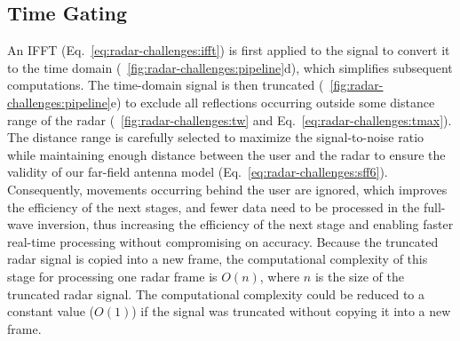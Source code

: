 

\subsection{Time Gating} \label{sec:radar-challenges:processing-strategy:time-gating}
An IFFT (Eq.~\ref{eq:radar-challenges:ifft}) is first applied to the signal to convert it to the time domain (\fig~\ref{fig:radar-challenges:pipeline}d), which simplifies subsequent computations.
The time-domain signal is then truncated (\fig~\ref{fig:radar-challenges:pipeline}e) to exclude all reflections occurring outside some distance range of the radar (\fig~\ref{fig:radar-challenges:tw} and Eq.~\ref{eq:radar-challenges:tmax}). The distance range is carefully selected to maximize the signal-to-noise ratio while maintaining enough distance between the user and the radar to ensure the validity of our far-field antenna model (Eq.~\ref{eq:radar-challenges:sff6}). Consequently, movements occurring behind the user are ignored, which improves the efficiency of the next stages, and fewer data need to be processed in the full-wave inversion, thus increasing the efficiency of the next stage and enabling faster real-time processing without compromising on accuracy.
%
Because the truncated radar signal is copied into a new frame, the computational complexity of this stage for processing one radar frame is $O(n)$, where $n$ is the size of the truncated radar signal. The computational complexity could be reduced to a constant value ($O(1)$) if the signal was truncated without copying it into a new frame.


